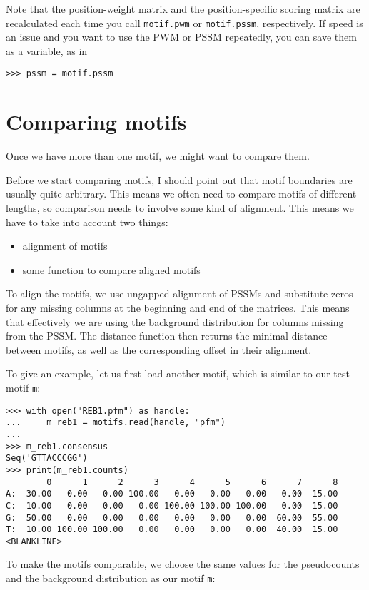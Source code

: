 Note that the position-weight matrix and the position-specific scoring matrix are recalculated each time you call \verb+motif.pwm+ or \verb+motif.pssm+, respectively. If speed is an issue and you want to use the PWM or PSSM repeatedly, you can save them as a variable, as in
\begin{verbatim}
>>> pssm = motif.pssm
\end{verbatim}

\section{Comparing motifs}
\label{sec:comp}
Once we have more than one motif, we might want to compare them.

Before we start comparing motifs, I should point out that motif
boundaries are usually quite arbitrary. This means we often need
to compare motifs of different lengths, so comparison needs to involve
some kind of alignment.  This means we have to take into account two things:
\begin{itemize}
\item alignment of motifs
\item some function to compare aligned motifs
\end{itemize}
To align the motifs, we use ungapped alignment of PSSMs and substitute zeros
for any missing columns at the beginning and end of the matrices. This means
that effectively we are using the background distribution for columns missing
from the PSSM.
The distance function then returns the minimal distance between motifs, as
well as the corresponding offset in their alignment.

To give an example, let us first load another motif,
which is similar to our test motif \verb|m|:

\begin{verbatim}
>>> with open("REB1.pfm") as handle:
...     m_reb1 = motifs.read(handle, "pfm")
...
>>> m_reb1.consensus
Seq('GTTACCCGG')
>>> print(m_reb1.counts)
        0      1      2      3      4      5      6      7      8
A:  30.00   0.00   0.00 100.00   0.00   0.00   0.00   0.00  15.00
C:  10.00   0.00   0.00   0.00 100.00 100.00 100.00   0.00  15.00
G:  50.00   0.00   0.00   0.00   0.00   0.00   0.00  60.00  55.00
T:  10.00 100.00 100.00   0.00   0.00   0.00   0.00  40.00  15.00
<BLANKLINE>
\end{verbatim}

To make the motifs comparable, we choose the same values for the pseudocounts and the background distribution as our motif \verb|m|:


